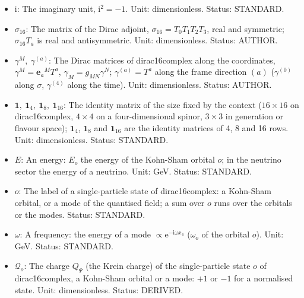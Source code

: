 \documentclass[
  10pt,
]{article}
\begin{document}
\begin{itemize}
  (a 16-component spinor function of \(\sigma\)); as a four-dimensional
  field, \(\chi\) denotes the particle of the level of dirac16complex at
  the fold (a long-lived resonance) and \(\bar\chi\) its antiparticle.
  Unit: GeV\(^{2}\) (with the \(V_*\) normalisation). Status: DERIVED.
\item
  \(\mathrm{i}\): The imaginary unit, \(\mathrm{i}^2 = -1\). Unit:
  dimensionless. Status: STANDARD.
\item
  \(\sigma_{16}\): The matrix of the Dirac adjoint,
  \(\sigma_{16} = T_0T_1T_2T_3\), real and symmetric; \(\sigma_{16}T_a\)
  is real and antisymmetric. Unit: dimensionless. Status: AUTHOR.
\item
  \(\gamma^M,\ \gamma^{(a)}\): The Dirac matrices of dirac16complex
  along the coordinates, \(\gamma^M = \mathbf{e}_a{}^MT^a\),
  \(\gamma_M = g_{MN}\gamma^N\); \(\gamma^{(a)} = T^a\) along the frame
  direction \((a)\) (\(\gamma^{(0)}\) along \(\sigma\), \(\gamma^{(4)}\)
  along the time). Unit: dimensionless. Status: AUTHOR.
\item
  \(\mathbf{1},\ \mathbf{1}_4,\ \mathbf{1}_8,\ \mathbf{1}_{16}\): The
  identity matrix of the size fixed by the context (\(16 \times 16\) on
  dirac16complex, \(4 \times 4\) on a four-dimensional spinor,
  \(3 \times 3\) in generation or flavour space); \(\mathbf{1}_4\),
  \(\mathbf{1}_8\) and \(\mathbf{1}_{16}\) are the identity matrices of
  4, 8 and 16 rows. Unit: dimensionless. Status: STANDARD.
\item
  \(E\): An energy: \(E_o\) the energy of the Kohn-Sham orbital \(o\);
  in the neutrino sector the energy of a neutrino. Unit: GeV. Status:
  STANDARD.
\item
  \(o\): The label of a single-particle state of dirac16complex: a
  Kohn-Sham orbital, or a mode of the quantised field; a sum over \(o\)
  runs over the orbitals or the modes. Status: STANDARD.
\item
  \(\omega\): A frequency: the energy of a mode
  \(\propto \mathrm{e}^{-\mathrm{i}\omega x_4}\) (\(\omega_o\) of the
  orbital \(o\)). Unit: GeV. Status: STANDARD.
\item
  \(\mathcal{Q}_o\): The charge \(Q_\Psi\) (the Krein charge) of the
  single-particle state \(o\) of dirac16complex, a Kohn-Sham orbital or
  a mode: \(+1\) or \(-1\) for a normalised state. Unit: dimensionless.
  Status: DERIVED.
\end{itemize}
\end{document}
